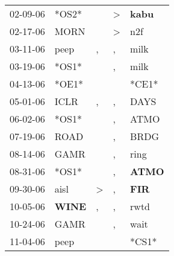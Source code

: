 \begin{supertabular}{p{0.07\textwidth}p{0.06\textwidth}p{0.02\textwidth}p{0.02\textwidth}p{0.06\textwidth}}
          02-09-06\textsuperscript{} &                            *OS2* &                  &     \textgreater &  \textbf{kabu\textsuperscript{}} \\
          02-17-06\textsuperscript{} &           MORN\textsuperscript{} &                  &     \textgreater &            n2f\textsuperscript{} \\
          03-11-06\textsuperscript{} &           peep\textsuperscript{} &                , &                , &           milk\textsuperscript{} \\
          03-19-06\textsuperscript{} &                            *OS1* &                  &                , &           milk\textsuperscript{} \\
          04-13-06\textsuperscript{} &                            *OE1* &                  &                  &                            *CE1* \\
          05-01-06\textsuperscript{} &           ICLR\textsuperscript{} &                , &                , &           DAYS\textsuperscript{} \\
          06-02-06\textsuperscript{} &                            *OS1* &                  &                , &           ATMO\textsuperscript{} \\
          07-19-06\textsuperscript{} &           ROAD\textsuperscript{} &                  &                , &           BRDG\textsuperscript{} \\
          08-14-06\textsuperscript{} &           GAMR\textsuperscript{} &                  &                , &           ring\textsuperscript{} \\
          08-31-06\textsuperscript{} &                            *OS1* &                  &                , &  \textbf{ATMO\textsuperscript{}} \\
          09-30-06\textsuperscript{} &           aisl\textsuperscript{} &     \textgreater &                , &   \textbf{FIR\textsuperscript{}} \\
          10-05-06\textsuperscript{} &  \textbf{WINE\textsuperscript{}} &                , &                , &           rwtd\textsuperscript{} \\
          10-24-06\textsuperscript{} &           GAMR\textsuperscript{} &                  &                , &           wait\textsuperscript{} \\
          11-04-06\textsuperscript{} &           peep\textsuperscript{} &                  &                  &                            *CS1* \\

\end{supertabular}
